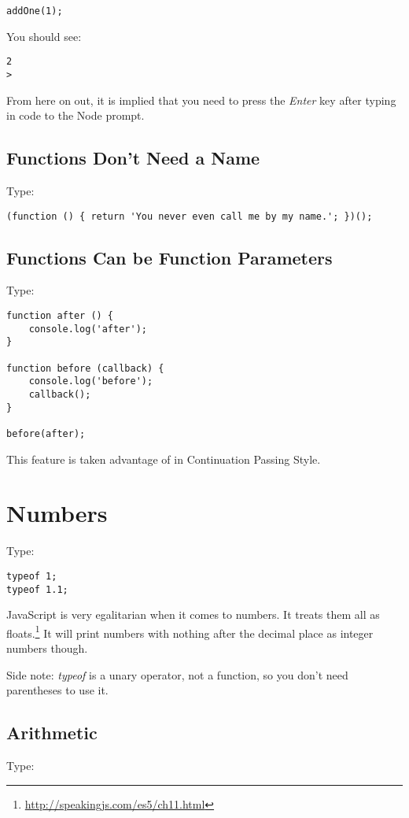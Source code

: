 \documentclass{article}
\begin{document}
\begin{lstlisting}
addOne(1);
\end{lstlisting}

You should see:

\begin{lstlisting}
2
>
\end{lstlisting}

From here on out, it is implied that you need to press the \emph{Enter} key after typing in code to the Node prompt.

\subsection{Functions Don't Need a Name}
Type:

\begin{lstlisting}
(function () { return 'You never even call me by my name.'; })();
\end{lstlisting}

\subsection{Functions Can be Function Parameters}
Type:

\begin{lstlisting}
function after () {
    console.log('after');
}

function before (callback) {
    console.log('before');
    callback();
}

before(after);
\end{lstlisting}

This feature is taken advantage of in Continuation Passing Style.

\section{Numbers}
Type:

\begin{lstlisting}
typeof 1;
typeof 1.1;
\end{lstlisting}

JavaScript is very egalitarian when it comes to numbers. It treats them all as floats.\footnote{\url{http://speakingjs.com/es5/ch11.html}} It will print numbers with nothing after the decimal place as integer numbers though.

Side note: \emph{typeof} is a unary operator, not a function, so you don't need parentheses to use it.

\subsection{Arithmetic}
Type:
\end{document}
